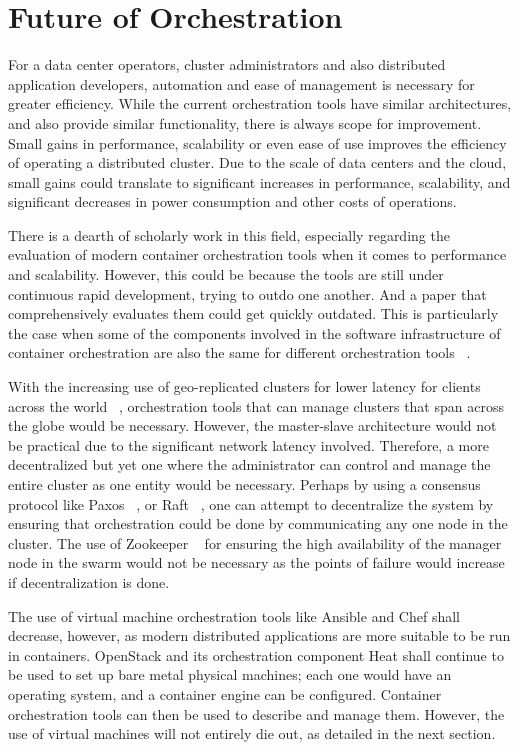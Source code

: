 \documentclass[10pt,twocolumn]{article}
\begin{document}
\section{Future of Orchestration}

For a data center operators, cluster administrators and also distributed application developers, automation and ease of management is necessary for greater efficiency.
While the current orchestration tools have similar architectures, and also provide similar functionality, there is always scope for improvement.
Small gains in performance, scalability or even ease of use improves the efficiency of operating a distributed cluster.
Due to the scale of data centers and the cloud, small gains could translate to significant increases in performance, scalability, and significant decreases in power consumption and other costs of operations.

There is a dearth of scholarly work in this field, especially regarding the evaluation of modern container orchestration tools when it comes to performance and scalability.
However, this could be because the tools are still under continuous rapid development, trying to outdo one another.
And a paper that comprehensively evaluates them could get quickly outdated.
This is particularly the case when some of the components involved in the software infrastructure of container orchestration are also the same for different orchestration tools ~\cite{intro_docker}.

With the increasing use of geo-replicated clusters for lower latency for clients across the world ~\cite{georeplicated}, orchestration tools that can manage clusters that span across the globe would be necessary.
However, the master-slave architecture would not be practical due to the significant network latency involved.
Therefore, a more decentralized but yet one where the administrator can control and manage the entire cluster as one entity would be necessary.
Perhaps by using a consensus protocol like Paxos ~\cite{paxos}, or Raft ~\cite{raft}, one can attempt to decentralize the system by ensuring that orchestration could be done by communicating any one node in the cluster.
The use of Zookeeper ~\cite{zookeeper} for ensuring the high availability of the manager node in the swarm would not be necessary as the points of failure would increase if decentralization is done.

The use of virtual machine orchestration tools like Ansible and Chef shall decrease, however, as modern distributed applications are more suitable to be run in containers.
OpenStack and its orchestration component Heat shall continue to be used to set up bare metal physical machines; each one would have an operating system, and a container engine can be configured.
Container orchestration tools can then be used to describe and manage them.
However, the use of virtual machines will not entirely die out, as detailed in the next section.
\end{document}
